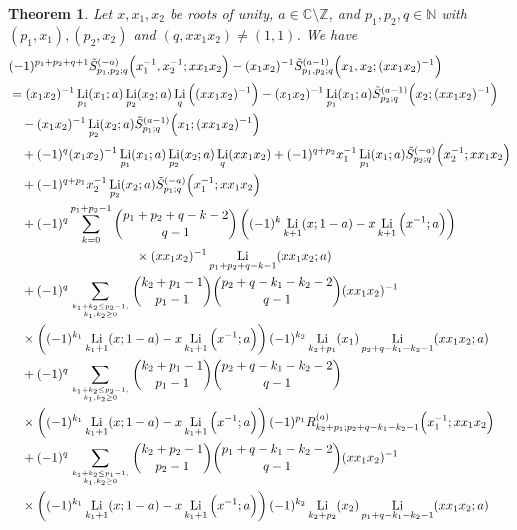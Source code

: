 \documentclass[11pt]{article}
\DeclareMathOperator{\Li}{Li}
\def\N{\mathbb{N}}
\def\Z{\mathbb{Z}}
\theoremstyle{plain}
\newtheorem{thm}{Theorem}[section]
\theoremstyle{definition}
\begin{document}
\begin{thm}\label{thm-quadratic-CES-two} Let $x,x_1,x_2$ be roots of unity, $a\in \mathbb{C}\setminus \Z$, and $p_1,p_2,q\in\N$ with $(p_1,x_1), (p_2,x_2) $ and $ (q,xx_1x_2)\neq (1,1)$. We have
\begin{align}
	&(-1)^{p_1+p_2+q+1}\tilde{S}^{(-a)}_{p_1,p_2;q}\Big(x_1^{-1},x_2^{-1};xx_1x_2\Big)-(x_1x_2)^{-1}\tilde{S}^{(a-1)}_{p_1,p_2;q}\Big(x_1,x_2;(xx_1x_2)^{-1}\Big)\nonumber\\
	&=(x_1x_2)^{-1}\Li_{p_1}(x_1;a)\Li_{p_2}(x_2;a)\Li_q\Big((xx_1x_2)^{-1}\Big)-(x_1x_2)^{-1}\Li_{p_1}(x_1;a)\tilde{S}^{(a-1)}_{p_2;q}\Big(x_2;(xx_1x_2)^{-1}\Big)\nonumber\\
	&\quad-(x_1x_2)^{-1}\Li_{p_2}(x_2;a)\tilde{S}^{(a-1)}_{p_1;q}\Big(x_1;(xx_1x_2)^{-1}\Big)\nonumber\\
	&\quad+(-1)^q(x_1x_2)^{-1}\Li_{p_1}(x_1;a)\Li_{p_2}(x_2;a)\Li_q(xx_1x_2)+(-1)^{q+p_2}x_1^{-1}\Li_{p_1}(x_1;a)\tilde{S}^{(-a)}_{p_2;q}\Big(x_2^{-1};xx_1x_2\Big)\nonumber\\
	&\quad+(-1)^{q+p_1}x_2^{-1}\Li_{p_2}(x_2;a)\tilde{S}^{(-a)}_{p_1;q}\Big(x_1^{-1};xx_1x_2\Big)\nonumber\\
	&\quad+(-1)^q\sum_{k=0}^{p_1+p_2-1}\binom{p_1+p_2+q-k-2}{q-1}\left((-1)^k\Li_{k+1}(x;1-a)-x \Li_{k+1}\Big(x^{-1};a\Big)\right)\nonumber\\&\qquad\qquad\qquad\qquad\qquad\times(xx_1x_2)^{-1}\Li_{p_1+p_2+q-k-1}(xx_1x_2;a)\nonumber\\
	&\quad+(-1)^q \sum_{k_1+k_2\leq p_2-1,\atop k_1,k_2\geq 0} \binom{k_2+p_1-1}{p_1-1}\binom{p_2+q-k_1-k_2-2}{q-1}(xx_1x_2)^{-1} \nonumber\\
	&\quad\times\left((-1)^{k_1}\Li_{k_1+1}(x;1-a)-x \Li_{k_1+1}\Big(x^{-1};a\Big)\right)(-1)^{k_2}\Li_{k_2+p_1}(x_1)\Li_{p_2+q-k_1-k_2-1}(xx_1x_2;a)\nonumber\\
	&\quad+(-1)^q \sum_{k_1+k_2\leq p_2-1,\atop k_1,k_2\geq 0} \binom{k_2+p_1-1}{p_1-1}\binom{p_2+q-k_1-k_2-2}{q-1} \nonumber\\
	&\quad\times\left((-1)^{k_1}\Li_{k_1+1}(x;1-a)-x \Li_{k_1+1}\Big(x^{-1};a\Big)\right)(-1)^{p_1}R^{(a)}_{k_2+p_1;p_2+q-k_1-k_2-1}\Big(x_1^{-1};xx_1x_2\Big)\nonumber\\
	&\quad+(-1)^q \sum_{k_1+k_2\leq p_1-1,\atop k_1,k_2\geq 0} \binom{k_2+p_2-1}{p_2-1}\binom{p_1+q-k_1-k_2-2}{q-1}(xx_1x_2)^{-1} \nonumber\\
	&\quad\times\left((-1)^{k_1}\Li_{k_1+1}(x;1-a)-x \Li_{k_1+1}\Big(x^{-1};a\Big)\right)(-1)^{k_2}\Li_{k_2+p_2}(x_2)\Li_{p_1+q-k_1-k_2-1}(xx_1x_2;a)\nonumber\\

\end{align}
\end{thm}
\end{document}
